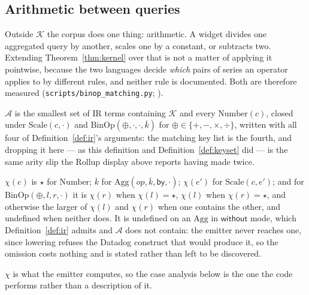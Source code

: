 \iffull\fi

\subsection{Arithmetic between queries}
\label{sec:binop-soundness}

Outside $\mathcal{K}$ the corpus does one thing: arithmetic. A widget divides one
aggregated query by another, scales one by a constant, or subtracts two. Extending
Theorem~\ref{thm:kernel} over that is not a matter of applying it pointwise, because the
two languages decide \emph{which} pairs of series an operator applies to by different
rules, and neither rule is documented. Both are therefore measured
(\texttt{scripts\slash binop\_matching.py}; ).

\begin{definition}\label{def:arith}
$\mathcal{A}$ is the smallest set of IR terms containing $\mathcal{K}$ and every
$\mathrm{Number}(c)$, closed under $\mathrm{Scale}(c,\cdot)$ and
$\mathrm{BinOp}(\oplus,\cdot,\cdot,\overline{k})$ for $\oplus\in\{+,-,\times,\div\}$,
written with all four of Definition~\ref{def:ir}'s arguments: the matching key list is
the fourth, and dropping it here --- as this definition and
Definition~\ref{def:keyset} did --- is the same arity slip the $\mathrm{Rollup}$ display
above reports having made twice.
\end{definition}

\begin{definition}\label{def:keyset}
$\chi(e)$ is $\star$ for $\mathrm{Number}$; $\overline{k}$ for
$\mathrm{Agg}(\mathit{op},\overline{k},\mathsf{by},\cdot)$; $\chi(e')$ for
$\mathrm{Scale}(c,e')$; and for $\mathrm{BinOp}(\oplus,l,r,\cdot)$ it is $\chi(r)$ when
$\chi(l)=\star$, $\chi(l)$ when $\chi(r)=\star$, and otherwise the larger of $\chi(l)$
and $\chi(r)$ when one contains the other, and undefined when neither does.
It is undefined on an $\mathrm{Agg}$ in $\mathsf{without}$ mode, which
Definition~\ref{def:ir} admits and $\mathcal{A}$ does not contain: the emitter never
reaches one, since lowering refuses the Datadog construct that would produce it, so the
omission costs nothing and is stated rather than left to be discovered.
\end{definition}

\noindent
$\chi$ is what the emitter computes, so the case analysis below is the one the code
performs rather than a description of it.

